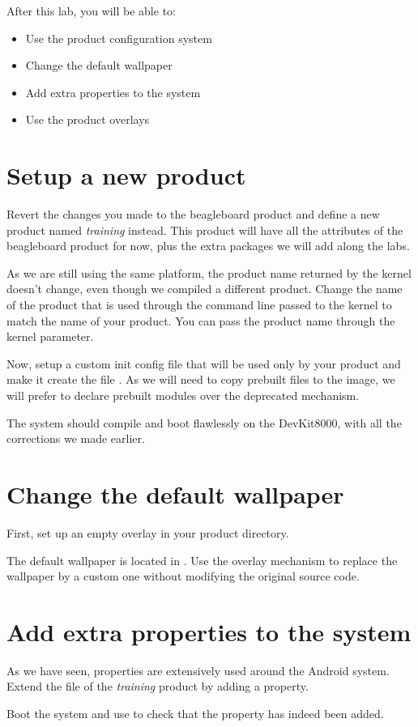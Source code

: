 
After this lab, you will be able to:
\begin{itemize}
  \item Use the product configuration system
  \item Change the default wallpaper
  \item Add extra properties to the system
  \item Use the product overlays
\end{itemize}

\section{Setup a new product}

Revert the changes you made to the beagleboard product and define a new product
named \textit{training} instead. This product will have all the attributes of
the beagleboard product for now, plus the extra packages we will add along the
labs.

As we are still using the same platform, the product name returned by the
kernel doesn't change, even though we compiled a different product. Change
the name of the product that is used through the command line passed to the
kernel to match the name of your product. You can pass the product name through
the  kernel parameter.

Now, setup a custom init config file that will be used only by your
product and make it create the file . As we
will need to copy prebuilt files to the image, we will prefer to
declare prebuilt modules over the deprecated 
mechanism.

The system should compile and boot flawlessly on the DevKit8000, with all the
corrections we made earlier.

\section{Change the default wallpaper}

First, set up an empty overlay in your product directory.

The default wallpaper is located in .
Use the overlay mechanism to replace the wallpaper by a custom one without
modifying the original source code.

\section{Add extra properties to the system}

As we have seen, properties are extensively used around the Android system.
Extend the  file of the \textit{training} product by adding a
 property.

Boot the system and use  to check that the property has indeed been added.
